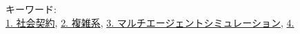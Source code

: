 ~ \\

~ \\
キーワード:\\
\underline{1. 社会契約},
\underline{2. 複雑系},
\underline{3. マルチエージェントシミュレーション},
\underline{4. }
\begin{flushright}
\dept \\
\author
\end{flushright}
